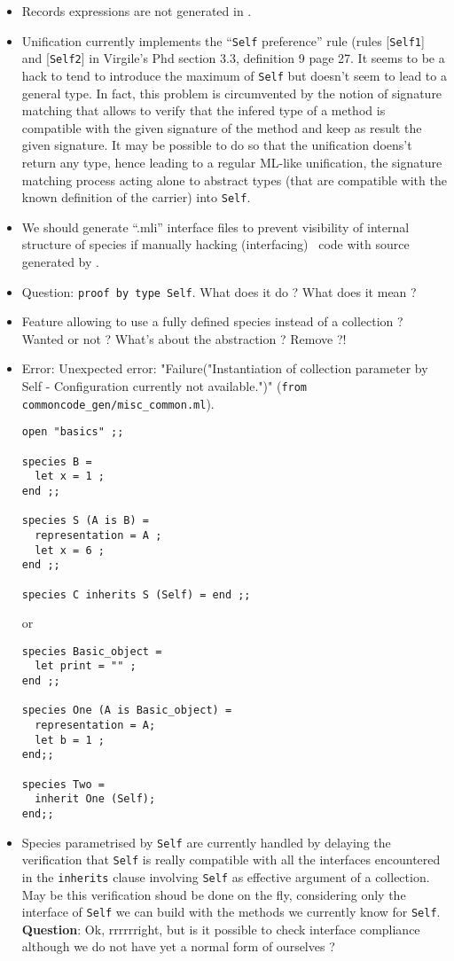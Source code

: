 \begin{itemize}
\item Records expressions are not generated in \coq.

\item Unification currently implements the ``{\tt Self} preference''
  rule (rules [{\tt Self1}] and [{\tt Self2}] in Virgile's Phd section
  3.3, definition 9 page 27. It seems to be a hack to tend to
  introduce the maximum of {\tt Self} but doesn't seem to lead to a
  general type. In fact, this problem is circumvented by the notion of
  signature matching that allows to verify that the infered type of a
  method is compatible with the given signature of the method and keep
  as result the given signature. It may be possible to do so that the
  unification doens't return any type, hence leading to a regular
  ML-like unification, the signature matching process acting alone to
  abstract types (that are compatible with the known definition of the
  carrier) into {\tt Self}.

\item We should generate ``.mli'' interface files to prevent
  visibility of internal structure of species if manually hacking
  (interfacing) \ocaml\ code with source generated by \focalizec.

\item Question: {\tt proof by type Self}. What does it do ? What does
  it mean ?

\item Feature allowing to use a fully defined species instead of a
collection ? Wanted or not ? What's about the abstraction ? Remove ?!

\item Error: Unexpected error: "Failure("Instantiation of collection
  parameter by Self - Configuration currently not available.")"
  ({\tt from commoncode\_gen/misc\_common.ml}).
\noindent
{\footnotesize
\begin{lstlisting}
open "basics" ;;

species B =
  let x = 1 ;
end ;;

species S (A is B) =
  representation = A ;
  let x = 6 ;
end ;;

species C inherits S (Self) = end ;;
\end{lstlisting}
}
or
\noindent
{\footnotesize
\begin{lstlisting}
species Basic_object =
  let print = "" ;
end ;;

species One (A is Basic_object) =
  representation = A;
  let b = 1 ;
end;;

species Two =
  inherit One (Self);
end;;
\end{lstlisting}
}
\item Species parametrised by {\tt Self} are currently handled by
  delaying the verification that {\tt Self} is really compatible with
  all the interfaces encountered in the {\tt inherits} clause
  involving {\tt Self} as effective argument of a collection. May be
  this verification shoud be done on the fly, considering only the
  interface of {\tt Self} we can build with the methods we currently
  know for {\tt Self}. {\bf Question}: Ok, rrrrrright, but is it
  possible to check interface compliance although we do not have yet a
  normal form of ourselves ?


\end{itemize}
